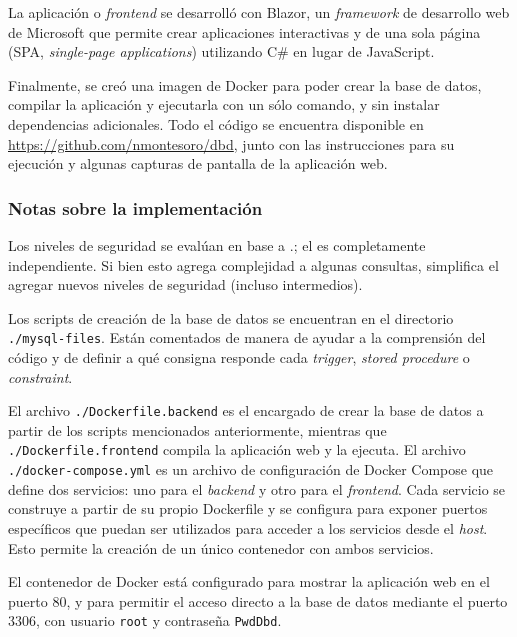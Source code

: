 La aplicación o \textit{frontend} se desarrolló con Blazor, un 
\textit{framework} de desarrollo web de Microsoft que permite crear aplicaciones
interactivas y de una sola página (SPA, \textit{single-page applications}) 
utilizando C\# en lugar de JavaScript.

Finalmente, se creó una imagen de Docker para poder crear la base de datos,
compilar la aplicación y ejecutarla con un sólo comando, y sin instalar 
dependencias adicionales. Todo el código se encuentra disponible en 
\url{https://github.com/nmontesoro/dbd}, junto con las instrucciones para su
ejecución y algunas capturas de pantalla de la aplicación web.

\subsubsection{Notas sobre la implementación}

Los niveles de seguridad se evalúan en base a .; el 
 es completamente independiente. Si bien esto agrega complejidad
a algunas consultas, simplifica el agregar nuevos niveles de seguridad (incluso
intermedios).

Los scripts de creación de la base de datos se encuentran en el directorio 
\texttt{./mysql-files}. Están comentados de manera de ayudar a la comprensión
del código y de definir a qué consigna responde cada \textit{trigger}, 
\textit{stored procedure} o \textit{constraint}.

El archivo \texttt{./Dockerfile.backend} es el encargado de crear la base de 
datos a partir de los scripts mencionados anteriormente, mientras que 
\texttt{./Dockerfile.frontend} compila la aplicación web y la ejecuta.
El archivo \texttt{./docker-compose.yml} es un archivo de configuración de 
Docker Compose que define dos servicios: uno para el \textit{backend} y otro 
para el \textit{frontend}. Cada servicio se construye a partir de su propio 
Dockerfile y se configura para exponer puertos específicos que puedan ser 
utilizados para acceder a los servicios desde el \textit{host}. Esto permite la
creación de un único contenedor con ambos servicios.

El contenedor de Docker está configurado para mostrar la aplicación web en el 
puerto 80, y para permitir el acceso directo a la base de datos mediante el 
puerto 3306, con usuario \verb|root| y contraseña \verb|PwdDbd|.

